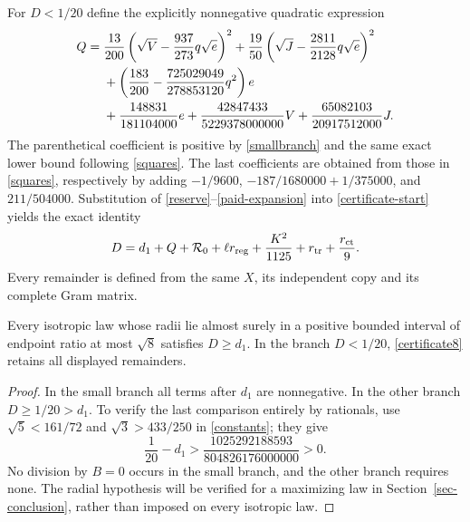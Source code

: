 For $D<1/20$ define the explicitly nonnegative quadratic expression
\begin{align}\label{Q8}
 Q={}&\frac{13}{200}\left(\sqrt V-\frac{937}{273}q\sqrt e\right)^2
       +\frac{19}{50}\left(\sqrt J-\frac{2811}{2128}q\sqrt e\right)^2\notag\\
 &+\left(\frac{183}{200}-\frac{725029049}{278853120}q^2\right)e\notag\\
 &+\frac{148831}{181104000}e
       +\frac{42847433}{5229378000000}V+\frac{65082103}{20917512000}J.
\end{align}
The parenthetical coefficient is positive by \eqref{smallbranch} and the
same exact lower bound following \eqref{squares}. The last coefficients are
obtained from those in \eqref{squares}, respectively by adding
$-1/9600$, $-187/1680000+1/375000$, and $211/504000$.
Substitution of \eqref{reserve}--\eqref{paid-expansion} into \eqref{certificate-start} yields the exact identity
\begin{equation}\label{certificate8}
 D=d_1+Q+{\cal R}_0+\ell r_{\rm reg}
          +\frac{K^2}{1125}+r_{\rm tr}+\frac{r_{\rm ct}}9.
\end{equation}
Every remainder is defined from the same $X$, its independent copy and its
complete Gram matrix.
\begin{proposition}\label{conditional8}
Every isotropic law whose radii lie almost surely in a positive bounded
interval of endpoint ratio at most $\sqrt8$ satisfies $D\ge d_1$.
In the branch $D<1/20$, \eqref{certificate8} retains all displayed remainders.
\end{proposition}
\begin{proof}
In the small branch all terms after $d_1$ are nonnegative. In the other
branch $D\ge1/20>d_1$. To verify the last comparison entirely by rationals,
use $\sqrt5<161/72$ and $\sqrt3>433/250$ in \eqref{constants}; they give
\[
 \frac1{20}-d_1>\frac{1025292188593}{804826176000000}>0.
\]
No division by $B=0$ occurs in the small branch, and the other branch
requires none. The radial hypothesis will be verified for a maximizing law in
Section~\ref{sec-conclusion}, rather than imposed on every isotropic law.
\end{proof}
